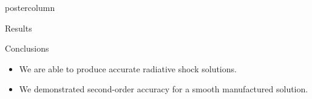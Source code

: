 \documentclass[xcolor=dvipsnames]{beamer}
\begin{document}
\begin{frame}
\begin{columns}
\begin{column}{.49\textwidth}
\begin{beamercolorbox}[center,wd=\textwidth]{postercolumn}
\begin{minipage}[T]{0.95\textwidth}
{\begin{block}{Results}
\end{block}
\vfill
    \begin{block}{Conclusions}
    \begin{itemize}
        \item We are able to produce accurate radiative shock solutions.
        \item We demonstrated second-order accuracy for a smooth manufactured solution. 
      \end{itemize}
    \end{block}
     \vfill
}
\end{minipage}
\end{beamercolorbox}
\end{column}

\end{columns}
\end{frame}
\end{document}
